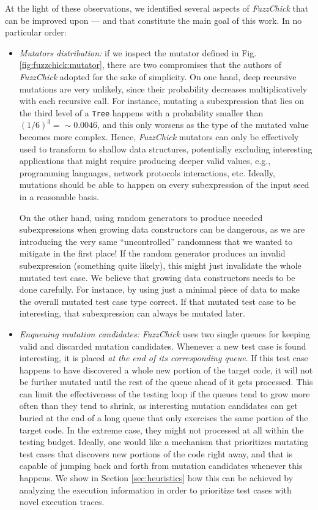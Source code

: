 \documentclass[acmsmall, anonymous]{acmart}
\newcommand{\fuzzchick}{\textit{FuzzChick}\xspace}
\begin{document}
At the light of these observations, we identified several aspects of \fuzzchick
that can be improved upon --- and that constitute the main goal of this work.
%
In no particular order:
%
\begin{itemize}
\item \emph{Mutators distribution:} if we inspect the mutator defined in Fig.
  \ref{fig:fuzzchick:mutator}, there are two compromises that the authors of
  \fuzzchick adopted for the sake of simplicity.
  On one hand, deep recursive mutations are very unlikely, since their
  probability decreases multiplicatively with each recursive call.
  For instance, mutating a subexpression that lies on the third level of a
  \texttt{Tree} happens with a probability smaller than $(1/6)^3 = \sim 0.0046$,
  and this only worsens as the type of the mutated value becomes more complex.
  Hence, \fuzzchick mutators can only be effectively used to transform to
  shallow data structures, potentially excluding interesting applications that
  might require producing deeper valid values, e.g., programming languages,
  network protocols interactions, etc.
  Ideally, mutations should be able to happen on every subexpression of the
  input seed in a reasonable basis.

  On the other hand, using random generators to produce neeeded subexpressions
  when growing data constructors can be dangerous, as we are introducing the
  very same ``uncontrolled'' randomness that we wanted to mitigate in the first
  place!
  If the random generator produces an invalid subexpression (something quite
  likely), this might just invalidate the whole mutated test case.
  We believe that growing data constructors needs to be done carefully.
  For instance, by using just a minimal piece of data to make the overall
  mutated test case type correct.
  If that mutated test case to be interesting, that subexpression can always be
  mutated later.

\item \emph{Enqueuing mutation candidates:} \fuzzchick uses two single queues for
  keeping valid and discarded mutation candidates.
  Whenever a new test case is found interesting, it is placed \emph{at the end
    of its corresponding queue}.
  If this test case happens to have discovered a whole new portion of the target
  code, it will not be further mutated until the rest of the queue ahead of it
  gets processed.
  This can limit the effectiveness of the testing loop if the queues tend to
  grow more often than they tend to shrink, as interesting mutation candidates
  can get buried at the end of a long queue that only exercises the same portion
  of the target code.
  In the extreme case, they might not processed at all within the testing budget.
  Ideally, one would like a mechanism that prioritizes mutating test cases
  that discovers new portions of the code right away, and that is capable of
  jumping back and forth from mutation candidates whenever this happens.
  We show in Section \ref{sec:heuristics} how this can be achieved by analyzing
  the execution information in order to prioritize test cases with novel
  execution traces.



\end{itemize}
\end{document}
